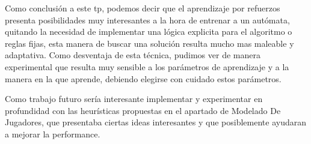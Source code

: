 Como conclusión a este tp, podemos decir que el aprendizaje por refuerzos presenta posibilidades muy interesantes a la hora de entrenar a un autómata, quitando la necesidad de implementar una lógica explicita para el algoritmo o reglas fijas, esta manera de buscar una solución resulta mucho mas maleable y adaptativa. Como desventaja de esta técnica, pudimos ver de manera experimental que resulta muy sensible a los parámetros de aprendizaje y a la manera en la que aprende, debiendo elegirse con cuidado estos parámetros.

Como trabajo futuro sería interesante implementar y experimentar en profundidad con las heurísticas propuestas en el apartado de Modelado De Jugadores, que presentaba ciertas ideas interesantes y que posiblemente ayudaran a mejorar la performance.